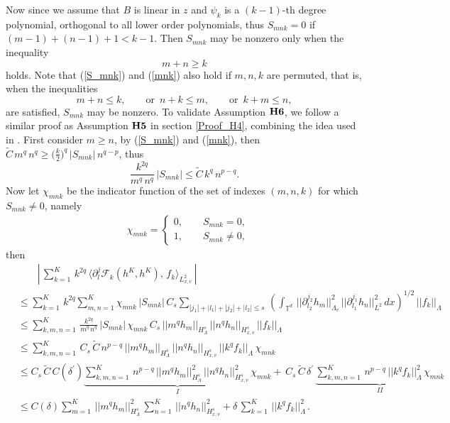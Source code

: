 \documentclass[final,onefignum,onetabnum]{siamart171218}
\begin{document}
Now since we assume that $B$ is linear in $z$ and $\psi_k$ is a $(k-1)$-th degree polynomial, orthogonal to all lower order polynomials, thus
$S_{mnk}=0$ if $(m-1)+(n-1)+1<k-1$. Then $S_{mnk}$ may be
nonzero only when the inequality
\begin{equation}\label{mnk} m+n\geq k \end{equation} holds.
Note that (\ref{S_mnk}) and (\ref{mnk}) also hold if $m, n, k$ are permuted, that is, when the inequalities
\begin{equation}\label{mnk1} m+n\leq k, \qquad \text{or  }\, n+k\leq m,\qquad \text{or }\, k+m\leq n, \end{equation}
are satisfied, $S_{mnk}$ may be nonzero.
To validate Assumption ${\bf H6}$, we follow a similar proof as Assumption ${\bf H5}$ in section \ref{Proof_H4}, combining the idea used in \cite{Rui}.
First consider $m\geq n$, by (\ref{S_mnk}) and (\ref{mnk}), then $\displaystyle \widetilde C\, m^q\, n^q \geq \bigg(\frac{k}{2}\bigg)^q\, |S_{mnk}|\, n^{q-p}$, thus
\begin{equation}\label{S1}\frac{k^{2q}}{m^q\, n^q}\, |S_{mnk}| \leq \widetilde C\, k^q\, n^{p-q}. \end{equation}
Now let $\chi_{mnk}$ be the indicator function of the set of indexes $(m,n,k)$ for which $S_{mnk} \neq 0$, namely
\begin{align}
&\label{chi}\displaystyle \chi_{mnk} = \begin{cases} 0, \qquad S_{mnk}=0, \\[2pt]
 1, \qquad S_{mnk}\neq 0,  \end{cases}
\end{align}
then
\begin{align*}
&\displaystyle \qquad \left|\,\sum_{k=1}^K\, k^{2q}\, \langle\partial_l^j \mathcal F_{k}(h^K, h^K), \, f_{k}\rangle_{L^2_{x,v}}\, \right|
  \\[2pt]
&\displaystyle \leq  \sum_{k=1}^K\, k^{2q}\sum_{m,n=1}^K \chi_{mnk}\, |S_{mnk}|\, C_s\sum_{|j_1|+|l_1|+|j_2|+|l_2|\leq s}\,
\left( \int_{\mathbb T^d}\, ||\partial_{l_2}^{j_2}h_m||_{\Lambda_v}^2\, ||\partial_{l_1}^{j_1}h_n||_{L^2}^2\, dx\right)^{1/2}\, ||f_k||_{\Lambda}\\[2pt]
&\displaystyle \leq \sum_{k,m,n=1}^K\,\frac{k^{2q}}{m^q\, n^q}\, |S_{mnk}|\, \chi_{mnk}\, C_s\, ||m^q h_m||_{H_{\Lambda}^s}\,||n^q h_n||_{H_{x,v}^s}\,
||f_k||_{\Lambda} \\[2pt]
&\displaystyle\leq\sum_{k,m,n=1}^K \, C_{s}\, \widetilde C\, n^{p-q}\, ||m^q h_m||_{H_{\Lambda}^s}\, ||n^q h_n||_{H_{x,v}^s}\,  ||k^q f_k||_{\Lambda}\,
\chi_{mnk}\\[2pt]
&\displaystyle\leq C_{s}\, \widetilde C\, C(\delta^{\prime}) \underbrace{\sum_{k,m,n=1}^K\, n^{p-q} \, ||m^q h_m||_{H_{\Lambda}^s}^2\, ||n^q h_n||_{H_{x,v}^s}^2\,\chi_{mnk}}_{I} +\,
C_{s}\, \widetilde C\, \delta^{\prime}\, \underbrace{\sum_{k,m,n=1}^K\, n^{p-q}\, ||k^q f_k||_{\Lambda}^2\,\chi_{mnk}}_{II} \\[2pt]
&\displaystyle \leq  C(\delta)\sum_{m=1}^K\, ||m^q h_m||_{H_{\Lambda}^s}^2 \, \sum_{n=1}^K\, ||n^q h_n||_{H_{x,v}^s}^2 + \delta\, \sum_{k=1}^K\, ||k^q f_k||_{\Lambda}^2\,.
\end{align*}
\end{document}

